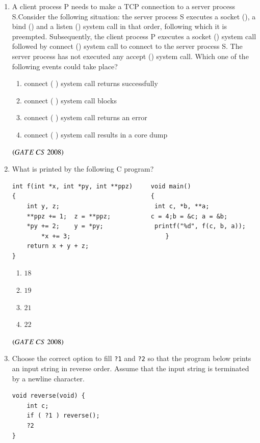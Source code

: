 \documentclass[journal, onecolumn]{IEEEtran}
\numberwithin{equation}{enumi}
\numberwithin{figure}{enumi}
\begin{document}
\begin{enumerate}
\item A client process P needs to make a TCP connection to a server process S.Consider the following situation: the server process S executes a socket (), a bind () and a listen () system call in that order, following which it is preempted. Subsequently, the client process P executes a socket () system call followed by connect () system call to connect to the server process S. The server process has not executed any accept () system call. Which one of the following events could take place? 
\begin{enumerate}
   \item  connect ( ) system call returns successfully
   \item  connect ( ) system call blocks
   \item connect ( ) system call returns an error
   \item connect ( ) system call results in a core dump 
\end{enumerate}   
\bigskip
\hfill $\left(GATE\ CS\  2008\right)$

\item What is printed by the following C program?
\begin{verbatim}
int f(int *x, int *py, int **ppz)     void main()
{                                     {
    int y, z;                          int c, *b, **a;
    **ppz += 1;  z = **ppz;           c = 4;b = &c; a = &b;
    *py += 2;    y = *py;              printf("%d", f(c, b, a));
        *x += 3;                          }
    return x + y + z;                  
}
\end{verbatim}
\vspace{-1em}%
\begin{multicols}{4}
\begin{enumerate}
   \item $18$
   \item $19$
   \item $21$
   \item $22$
\end{enumerate}
\end{multicols}
\hfill $\left(GATE\ CS\  2008\right)$

\item Choose the correct option to fill \texttt{?1} and \texttt{?2} so that the program below prints an input string in reverse order. Assume that the input string is terminated by a newline character.
\begin{verbatim}
void reverse(void) {
    int c;
    if ( ?1 ) reverse();
    ?2
}


\end{verbatim}
\end{enumerate}
\end{document}
